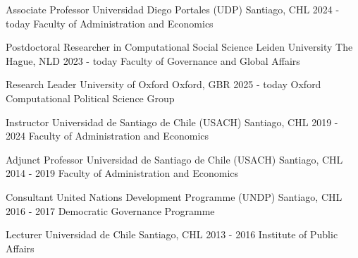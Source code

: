 





\begin{cventries}
\cventry
{Associate Professor} 
{Universidad Diego Portales (UDP)} 
{Santiago, CHL} 
{2024 - today}
{Faculty of Administration and Economics} \vspace{1.5mm}

\cventry
{Postdoctoral Researcher in Computational Social Science} 
{Leiden University} 
{The Hague, NLD} 
{2023 - today}
{Faculty of Governance and Global Affairs} \vspace{1.5mm}

\cventry
{Research Leader} 
{University of Oxford} 
{Oxford, GBR} 
{2025 - today}
{Oxford Computational Political Science Group} \vspace{1.5mm}
\end{cventries}
\pagebreak


\begin{cventries}
\cventry
{Instructor} 
{Universidad de Santiago de Chile (USACH)} 
{Santiago, CHL} 
{2019 - 2024}
{Faculty of Administration and Economics} \vspace{1.5mm}

\cventry
{Adjunct Professor} 
{Universidad de Santiago de Chile (USACH)} 
{Santiago, CHL} 
{2014 - 2019}
{Faculty of Administration and Economics} \vspace{1.5mm}

\cventry
{Consultant} 
{United Nations Development Programme (UNDP)} 
{Santiago, CHL} 
{2016 - 2017}
{Democratic Governance Programme} \vspace{1.5mm}

\cventry
{Lecturer} 
{Universidad de Chile} 
{Santiago, CHL} 
{2013 - 2016}
{Institute of Public Affairs}\vspace{1.5mm}
\end{cventries}
